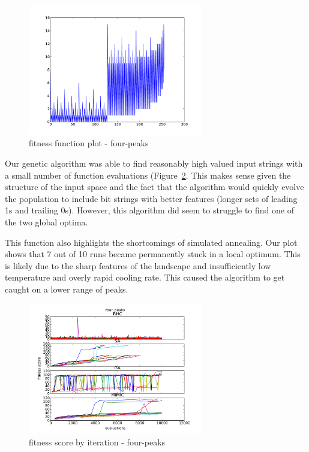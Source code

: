 \documentclass{sig-alternate}
\begin{document}
\begin{figure}[!htbp]
    \centering
    \includegraphics[width=3in]{part1.2/four-peaks-plot.pdf}
    \caption{fitness function plot - four-peaks\label{plot-four-peaks}}
\end{figure} 

Our genetic algorithm was able to find reasonably high valued input strings with a small number of function evaluations (Figure~\ref{over-time-four-peaks}. This makes sense given the structure of the input space and the fact that the algorithm would quickly evolve the population to include bit strings with better features (longer sets of leading 1s and trailing 0s). However, this algorithm did seem to struggle to find one of the two global optima.

This function also highlights the shortcomings of simulated annealing. Our plot shows that 7 out of 10 runs became permanently stuck in a local optimum. This is likely due to the sharp features of the landscape and insufficiently low temperature and overly rapid cooling rate. This caused the algorithm to get caught on a lower range of peaks.


\begin{figure}[!htbp]
    \centering
    \includegraphics[width=3in]{part1.2/four-peaks-over-time.pdf}
    \caption{fitness score by iteration - four-peaks\label{over-time-four-peaks}}
\end{figure} 
\end{document}

